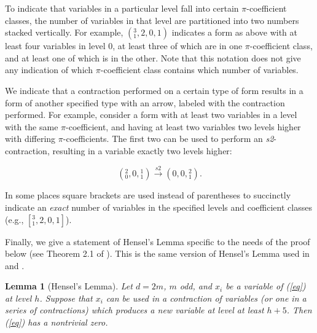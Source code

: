 \documentclass[12pt]{amsart}
\newtheorem{lemma}{Lemma}
\begin{document}
To indicate that variables in a particular level fall into certain $\pi$-coefficient classes, the number of variables in that level are partitioned into two numbers stacked vertically.  For example, $(^3_1, 2, 0, 1)$ indicates a form as above with at least four variables in level 0, at least three of which are in one $\pi$-coefficient class, and at least one of which is in the other.  Note that this notation does not give any indication of which $\pi$-coefficient class contains which number of variables.

We indicate that a contraction performed on a certain type of form results in a form of another specified type with an arrow, labeled with the contraction performed.  For example, consider a form with at least two variables in a level with the same $\pi$-coefficient, and having at least two variables two levels higher with differing $\pi$-coefficients.  The first two can be used to perform an \textit{s2}-contraction, resulting in a variable exactly two levels higher:

$$({}^{2}_{0}, 0, {}^{1}_{1}) \xrightarrow{s2} (0, 0, {}^{2}_{1}).$$

In some places square brackets are used instead of parentheses to succinctly indicate an \textit{exact} number of variables in the specified levels and coefficient classes (e.g., $[^3_1, 2, 0, 1]$).

Finally, we give a statement of Hensel's Lemma specific to the needs of the proof below (see Theorem 2.1 of \cite{leep2018diagonal}).  This is the same version of Hensel's Lemma used in \cite{knapp2016solubility} and \cite{2020arXiv200509770D}.


\begin{lemma}[Hensel's Lemma]
Let $d=2m$, $m$ odd, and $x_i$ be a variable of (\ref{eq}) at level $h$.  Suppose that $x_i$ can be used in a contraction of variables (or one in a series of contractions) which produces a new variable at level at least $h+5$.  Then (\ref{eq}) has a nontrivial zero.
\end{lemma}
\end{document}
